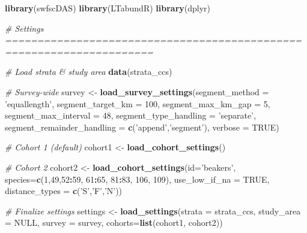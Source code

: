 \documentclass[
]{book}
\newenvironment{Shaded}{\begin{snugshade}}{\end{snugshade}}
\newcommand{\CommentTok}[1]{\textcolor[rgb]{0.56,0.35,0.01}{\textit{#1}}}
\newcommand{\DataTypeTok}[1]{\textcolor[rgb]{0.13,0.29,0.53}{#1}}
\newcommand{\DecValTok}[1]{\textcolor[rgb]{0.00,0.00,0.81}{#1}}
\newcommand{\KeywordTok}[1]{\textcolor[rgb]{0.13,0.29,0.53}{\textbf{#1}}}
\newcommand{\NormalTok}[1]{#1}
\newcommand{\OperatorTok}[1]{\textcolor[rgb]{0.81,0.36,0.00}{\textbf{#1}}}
\newcommand{\OtherTok}[1]{\textcolor[rgb]{0.56,0.35,0.01}{#1}}
\newcommand{\StringTok}[1]{\textcolor[rgb]{0.31,0.60,0.02}{#1}}
\begin{document}
\begin{Shaded}
\begin{Highlighting}[]
\KeywordTok{library}\NormalTok{(swfscDAS)}
\KeywordTok{library}\NormalTok{(LTabundR)}
\KeywordTok{library}\NormalTok{(dplyr)}

\CommentTok{# Settings =====================================================================}

\CommentTok{# Load strata & study area}
\KeywordTok{data}\NormalTok{(strata_ccs)}

\CommentTok{# Survey-wide}
\NormalTok{survey <-}\StringTok{ }
\StringTok{  }\KeywordTok{load_survey_settings}\NormalTok{(}\DataTypeTok{segment_method =} \StringTok{'equallength'}\NormalTok{,}
                       \DataTypeTok{segment_target_km =} \DecValTok{100}\NormalTok{,}
                       \DataTypeTok{segment_max_km_gap =} \DecValTok{5}\NormalTok{,}
                       \DataTypeTok{segment_max_interval =} \DecValTok{48}\NormalTok{,}
                       \DataTypeTok{segment_type_handling =} \StringTok{'separate'}\NormalTok{,}
                       \DataTypeTok{segment_remainder_handling =} \KeywordTok{c}\NormalTok{(}\StringTok{'append'}\NormalTok{,}\StringTok{'segment'}\NormalTok{),}
                       \DataTypeTok{verbose =} \OtherTok{TRUE}\NormalTok{)}

\CommentTok{# Cohort 1 (default)}
\NormalTok{cohort1 <-}\StringTok{ }\KeywordTok{load_cohort_settings}\NormalTok{()}

\CommentTok{# Cohort 2}
\NormalTok{cohort2 <-}\StringTok{ }
\StringTok{  }\KeywordTok{load_cohort_settings}\NormalTok{(}\DataTypeTok{id=}\StringTok{'beakers'}\NormalTok{,}
                       \DataTypeTok{species=}\KeywordTok{c}\NormalTok{(}\DecValTok{1}\NormalTok{,}\DecValTok{49}\NormalTok{,}\DecValTok{52}\OperatorTok{:}\DecValTok{59}\NormalTok{, }\DecValTok{61}\OperatorTok{:}\DecValTok{65}\NormalTok{, }\DecValTok{81}\OperatorTok{:}\DecValTok{83}\NormalTok{, }\DecValTok{106}\NormalTok{, }\DecValTok{109}\NormalTok{),}
                       \DataTypeTok{use_low_if_na =} \OtherTok{TRUE}\NormalTok{,}
                       \DataTypeTok{distance_types =} \KeywordTok{c}\NormalTok{(}\StringTok{'S'}\NormalTok{,}\StringTok{'F'}\NormalTok{,}\StringTok{'N'}\NormalTok{))}

\CommentTok{# Finalize settings}
\NormalTok{settings <-}\StringTok{ }\KeywordTok{load_settings}\NormalTok{(}\DataTypeTok{strata =}\NormalTok{ strata_ccs,}
                          \DataTypeTok{study_area =} \OtherTok{NULL}\NormalTok{,}
                          \DataTypeTok{survey =}\NormalTok{ survey,}
                          \DataTypeTok{cohorts=}\KeywordTok{list}\NormalTok{(cohort1,}
\NormalTok{                                       cohort2))}



\end{Highlighting}
\end{Shaded}
\end{document}
